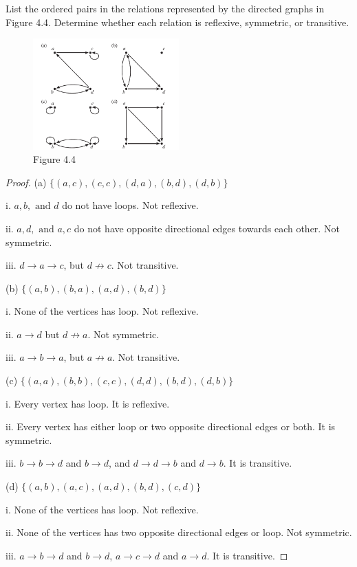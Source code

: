 \documentclass[12pt]{article}
\newenvironment{exercise}[2][Exercise]{\begin{trivlist}
\item[\hskip \labelsep {\bfseries #1}\hskip \labelsep {\bfseries #2.}]}{\end{trivlist}}
\newcommand{\nd}{\text{ and }}
\begin{document}
\begin{exercise}
	{4}
	List the ordered pairs in the relations represented by the directed graphs in Figure 4.4. Determine whether each relation is reflexive, symmetric, or transitive.
	\begin{figure}[H]
		\centering
		\includegraphics[width=0.5\textwidth]{figure4.4.png}
		\caption*{Figure 4.4}
	\end{figure}
\end{exercise}

\begin{proof}
	(a) $\{(a,c),(c,c),(d,a),(b,d),(d,b)\}$

	i. $a,b, \nd d$ do not have loops. Not reflexive.

	ii. $a,d, \nd a,c$ do not have opposite directional edges towards each other. Not symmetric.

	iii. $d\to a\to c$, but $d\not \to c$. Not transitive.

	(b) $\{(a,b),(b,a),(a,d),(b,d)\}$

	i. None of the vertices has loop. Not reflexive.
	
	ii. $a\to d$ but $d\not \to a$. Not symmetric.

	iii. $a\to b\to a$, but $a\not \to a$. Not transitive.
	
	(c) $\{(a,a), (b,b), (c,c),(d,d),(b,d),(d,b)\}$

	i. Every vertex has loop. It is reflexive.

	ii. Every vertex has either loop or two opposite directional edges or both. It is symmetric.

	iii. $b\to b\to d$ and $b\to d$, and $d\to d\to b$ and $d\to b$. It is transitive.
	
	(d) $\{(a,b),(a,c),(a,d),(b,d),(c,d)\}$

	i. None of the vertices has loop. Not reflexive.

	ii. None of the vertices has two opposite directional edges or loop. Not symmetric.

	iii. $a\to b\to d$ and $b\to d$, $a\to c\to d$ and $a\to d$. It is transitive.       
\end{proof}
\end{document}
